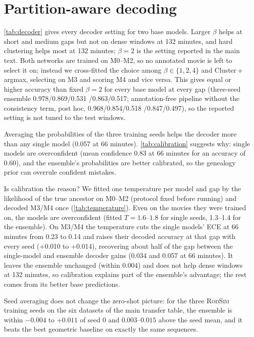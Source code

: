 \documentclass[10pt,twocolumn,letterpaper]{article}
\newcommand{\rodsim}{\textsc{RodSim}\xspace}
\begin{document}
\section{Partition-aware decoding}
\cref{tab:decoder} gives every decoder setting for two base models. Larger $\beta$ helps at short and medium gaps but not on dense windows at 132 minutes, and hard clustering helps most at 132 minutes; $\beta{=}2$ is the setting reported in the main text. Both networks are trained on M0--M2, so no annotated movie is left to select it on; instead we cross-fitted the choice among $\beta\in\{1,2,4\}$ and Cluster\,+\,argmax, selecting on M3 and scoring M4 and vice versa. This gives equal or higher accuracy than fixed $\beta{=}2$ for every base model at every gap (three-seed ensemble 0.978/0.869/0.531 /0.863/0.517; annotation-free pipeline without the consistency term, post hoc, 0.968/0.854/0.518 /0.847/0.497), so the reported setting is not tuned to the test windows.

Averaging the probabilities of the three training seeds helps the decoder more than any single model (0.057  at 66 minutes).
\cref{tab:calibration} suggests why: single models are overconfident (mean confidence 0.83 at 66 minutes for an accuracy of 0.60), and the ensemble's probabilities are better calibrated, so the genealogy prior can overrule confident mistakes.

Is calibration the reason? We fitted one temperature per model and gap by the likelihood of the true ancestor on M0--M2 (protocol fixed before running) and decoded M3/M4 once (\cref{tab:temperature}).
Even on the movies they were trained on, the models are overconfident (fitted $T{=}1.6$--$1.8$ for single seeds, 1.3--1.4 for the ensemble). On M3/M4 the temperature cuts the single models' ECE at 66 minutes from 0.23 to 0.14 and raises their decoded accuracy at that gap with every seed (+0.010 to +0.014), recovering about half of the gap between the single-model and ensemble decoder gains (0.034 and 0.057 at 66 minutes).
It leaves the ensemble unchanged (within 0.004) and does not help dense windows at 132 minutes, so calibration explains part of the ensemble's advantage; the rest comes from its better base predictions.

Seed averaging does not change the zero-shot picture: for the three \rodsim training seeds on the six datasets of the main transfer table, the ensemble is within $-0.004$ to $+0.011$ of seed 0 and $0.003$--$0.015$ above the seed mean, and it beats the best geometric baseline on exactly the same sequences.
\end{document}
